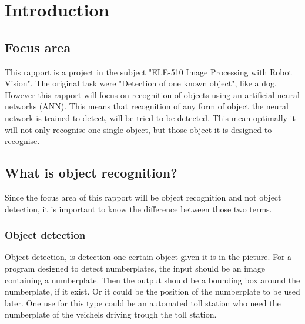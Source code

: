 \newpage

\section{Introduction}

\subsection{Focus area}
This rapport is a project in the subject "ELE-510 Image Processing with Robot Vision". The original task were "Detection of one known object", like a dog. However this rapport will focus on recognition of objects using an artificial neural networks (ANN). This means that recognition of any form of object the neural network is trained to detect, will be tried to be detected. This mean optimally it will not only recognise one single object, but those object it is designed to recognise. 

\subsection{What is object recognition?}
Since the focus area of this rapport will be object recognition and not object detection, it is important to know the difference between those two terms.

\subsubsection*{Object detection}
Object detection, is detection one certain object given it is in the picture. For a program designed to detect numberplates, the input should be an image containing a numberplate. Then the output should be a bounding box around the numberplate, if it exist. Or it could be the position of the numberplate to be used later. One use for this type could be an automated toll station who need the numberplate of the veichels driving trough the toll station.
